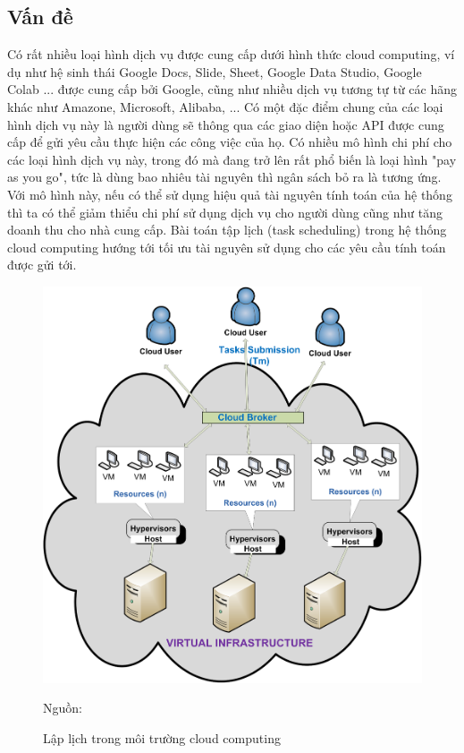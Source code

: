 \documentclass{my_style}
\newcommand{\source}[1]{\caption*{Nguồn: {#1}} }
\begin{document}
\subsection*{Vấn đề}
Có rất nhiều loại hình dịch vụ được cung cấp dưới hình thức cloud computing, ví dụ như hệ sinh thái Google Docs, Slide, Sheet, Google Data Studio, Google Colab ... được cung cấp bởi Google, cũng như nhiều dịch vụ tương tự từ các hãng khác như Amazone, Microsoft, Alibaba, ... Có một đặc điểm chung của các loại hình dịch vụ này là người dùng sẽ thông qua các giao diện hoặc API được cung cấp để gửi yêu cầu thực hiện các công việc của họ. Có nhiều mô hình chi phí cho các loại hình dịch vụ này, trong đó mà đang trở lên rất phổ biến là loại hình "pay as you go"\cite{6}, tức là dùng bao nhiêu tài nguyên thì ngân sách bỏ ra là tương ứng. Với mô hình này, nếu có thể sử dụng hiệu quả tài nguyên tính toán của hệ thống thì ta có thể giảm thiểu chi phí sử dụng dịch vụ cho người dùng cũng như tăng doanh thu cho nhà cung cấp. Bài toán tập lịch (task scheduling\cite{7}\cite{5}) trong hệ thống cloud computing hướng tới tối ưu tài nguyên sử dụng cho các yêu cầu tính toán được gửi tới. 
\begin{figure}
	\centering
	\includegraphics[scale=0.7]{images/cloud_computing_usecase.png}
	\caption{Lập lịch trong môi trường cloud computing}
	\label{fig:scheduling_in_cloud}
	\source{\cite{33}}
\end{figure}
\end{document}
